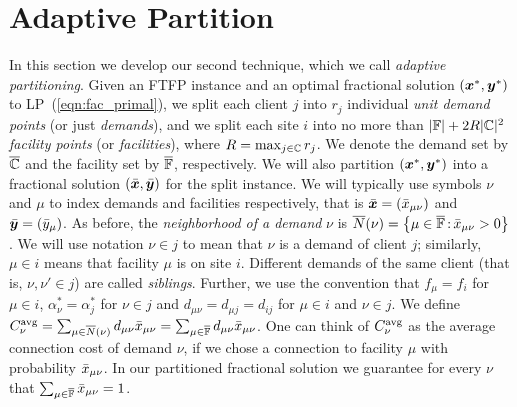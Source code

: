 \documentclass[oneside,final]{ucr}
\begin{document}
\section{Adaptive Partition}
\label{sec: adaptive partitioning}

In this section we develop our second technique, which we
call \emph{adaptive partitioning}. Given an FTFP instance
and an optimal fractional solution $(\boldsymbol{x}^\ast, \boldsymbol{y}^\ast)$
to LP~(\ref{eqn:fac_primal}), we split each client $j$ into
$r_j$ individual \emph{unit demand points} (or just
\emph{demands}), and we split each site $i$ into no more
than $|\mathbb{F}|+2R|\mathbb{C}|^2$ \emph{facility points} (or
\emph{facilities}), where $R=\max_{j\in\mathbb{C}}r_j$. We
denote the demand set by $\overline{\mathbb{C}}$ and the facility set
by $\overline{\mathbb{F}}$, respectively.  We will also partition
$(\boldsymbol{x}^\ast,\boldsymbol{y}^\ast)$ into a fractional solution
$(\bar{\boldsymbol{x}},\bar{\boldsymbol{y}})$ for the split instance.  We will
typically use symbols $\nu$ and $\mu$ to index demands and
facilities respectively, that is $\bar{\boldsymbol{x}} =
({\bar x}_{\mu\nu})$ and $\bar{\boldsymbol{y}} = ({\bar y}_{\mu})$.  As before,
the \emph{neighborhood of a demand} $\nu$ is
${\overline{N}}(\nu)={ \left\{ \mu\in\overline{\mathbb{F}} {\,:\,}
  {\bar x}_{\mu\nu}>0 \right\} }$.  We will use notation $\nu\in j$ to
mean that $\nu$ is a demand of client $j$; similarly,
$\mu\in i$ means that facility $\mu$ is on site
$i$. Different demands of the same client (that is,
$\nu,\nu'\in j$) are called \emph{siblings}.  Further, we
use the convention that $f_\mu = f_i$ for $\mu\in i$,
$\alpha_\nu^\ast = \alpha_j^\ast$ for $\nu\in j$ and
$d_{\mu\nu} = d_{\mu j} = d_{ij}$ for $\mu\in i$ and $\nu\in
j$.  We define $C^{{\mbox{\scriptsize\rm avg}}}_{\nu}
=\sum_{\mu\in{\overline{N}}(\nu)}d_{\mu\nu}{\bar x}_{\mu\nu} =
\sum_{\mu\in\overline{\mathbb{F}}}d_{\mu\nu}{\bar x}_{\mu\nu}$. 
One can think of $C^{{\mbox{\scriptsize\rm avg}}}_{\nu}$ as the
average connection cost of demand $\nu$, if we chose a
connection to facility $\mu$ with probability
${\bar x}_{\mu\nu}$. In our partitioned fractional solution we
guarantee for every $\nu$ that $\sum_{\mu\in\overline{\mathbb{F}}}
{\bar x}_{\mu\nu}=1$.
\end{document}
